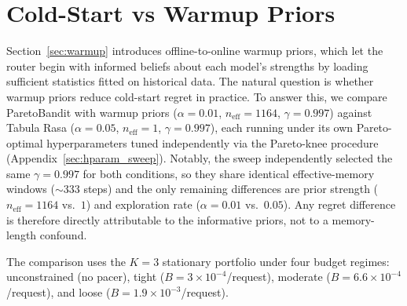 
\section{Cold-Start vs Warmup Priors}
\label{sec:warmup_ablation}

Section~\ref{sec:warmup} introduces offline-to-online warmup priors,
which let the router begin with informed beliefs about each model's
strengths by loading sufficient statistics fitted on historical data.
The natural question is whether warmup priors reduce cold-start
regret in practice.
To answer this, we compare ParetoBandit with warmup priors
($\alpha{=}0.01$, $n_{\text{eff}}{=}1164$,
$\gamma{=}0.997$) against Tabula Rasa
($\alpha{=}0.05$, $n_{\text{eff}}{=}1$,
$\gamma{=}0.997$), each running under its own
Pareto-optimal hyperparameters tuned independently via the
Pareto-knee procedure (Appendix~\ref{sec:hparam_sweep}).
Notably, the sweep independently selected the same
$\gamma{=}0.997$ for both conditions, so they share identical
effective-memory windows (${\sim}333$ steps) and the only remaining
differences are prior strength ($n_{\text{eff}}{=}1164$ vs.\ $1$)
and exploration rate ($\alpha{=}0.01$ vs.\ $0.05$).
Any regret difference is therefore directly attributable to the
informative priors, not to a memory-length confound.

The comparison uses the $K{=}3$ stationary portfolio under four
budget regimes: unconstrained (no pacer), tight
($B{=}3{\times}10^{-4}$/request), moderate
($B{=}6.6{\times}10^{-4}$/request), and loose
($B{=}1.9{\times}10^{-3}$/request).

